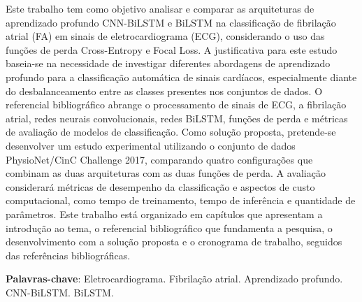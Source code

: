 \documentclass[
    12pt,                %
    openright,           %
    oneside,             %
    a4paper,             %
    english,             %
    brazil               %
]{abntex2}
\author{Daniel de Araujo Carvalho \\ Eduardo Dias Santos}
\begin{document}

\frenchspacing

\pretextual

\imprimircapa

\imprimirfolhaderosto

\begin{resumo}
Este trabalho tem como objetivo analisar e comparar as arquiteturas de aprendizado profundo CNN-BiLSTM e BiLSTM na classificação de fibrilação atrial (FA) em sinais de eletrocardiograma (ECG), considerando o uso das funções de perda Cross-Entropy e Focal Loss. A justificativa para este estudo baseia-se na necessidade de investigar diferentes abordagens de aprendizado profundo para a classificação automática de sinais cardíacos, especialmente diante do desbalanceamento entre as classes presentes nos conjuntos de dados. O referencial bibliográfico abrange o processamento de sinais de ECG, a fibrilação atrial, redes neurais convolucionais, redes BiLSTM, funções de perda e métricas de avaliação de modelos de classificação. Como solução proposta, pretende-se desenvolver um estudo experimental utilizando o conjunto de dados PhysioNet/CinC Challenge 2017, comparando quatro configurações que combinam as duas arquiteturas com as duas funções de perda. A avaliação considerará métricas de desempenho da classificação e aspectos de custo computacional, como tempo de treinamento, tempo de inferência e quantidade de parâmetros. Este trabalho está organizado em capítulos que apresentam a introdução ao tema, o referencial bibliográfico que fundamenta a pesquisa, o desenvolvimento com a solução proposta e o cronograma de trabalho, seguidos das referências bibliográficas.

\vspace{\onelineskip}

\noindent
\textbf{Palavras-chave}: Eletrocardiograma. Fibrilação atrial. Aprendizado profundo. CNN-BiLSTM. BiLSTM.
\end{resumo}
\end{document}
